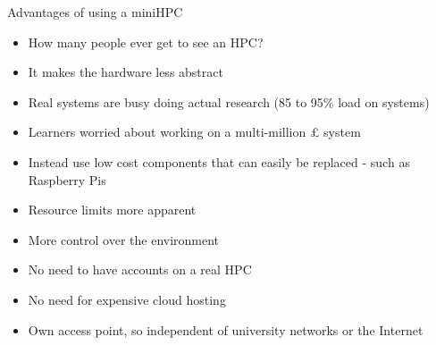 \begin{frame}{Advantages of using a miniHPC}
	\begin{itemize}[label={$\color{UmUBlue}\bullet$}]
		\item How many people ever get to see an HPC?
		\item It makes the hardware less abstract
		\item Real systems are busy doing actual research (85 to 95\% load on systems)
		\item Learners worried about working on a multi-million £ system
		\item Instead use low cost components that can easily be replaced - such as Raspberry Pis
		\item Resource limits more apparent
		\item More control over the environment
		\item No need to have accounts on a real HPC
		\item No need for expensive cloud hosting
		\item Own access point, so independent of university networks or the Internet
	\end{itemize}
\end{frame}